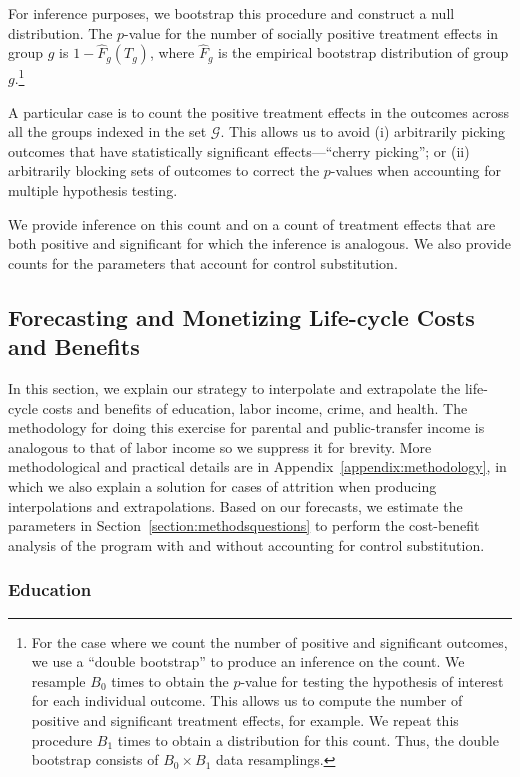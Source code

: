 For inference purposes, we bootstrap this procedure and construct a null distribution. The $p$-value for the number of socially positive treatment effects in group $g$ is $1 - \widehat{F}_{g} \left( T_{g} \right)$, where $ \widehat{F}_{g}$ is the empirical bootstrap distribution of group $g$.\footnote{For the case where we count the number of positive and significant outcomes, we use a ``double bootstrap'' to produce an inference on the count. We resample $B_{0}$ times to obtain the $p$-value for testing the hypothesis of interest for each individual outcome. This allows us to compute the number of positive and significant treatment effects, for example. We repeat this procedure $B_{1}$ times to obtain a distribution for this count. Thus, the double bootstrap consists of $B_{0} \times B_{1}$ data resamplings.}

A particular case is to count the positive treatment effects in the outcomes across all the groups indexed in the set $\mathcal{G}$. This allows us to avoid (i) arbitrarily picking outcomes that have statistically significant effects---``cherry picking''; or (ii) arbitrarily blocking sets of outcomes to correct the $p$-values when accounting for multiple hypothesis testing.

We provide inference on this count and on a count of treatment effects that are both positive and significant for which the inference is analogous. We also provide counts for the parameters that account for control substitution.

\subsection{Forecasting and Monetizing Life-cycle Costs and Benefits} \label{section:cbamethodology}

\noindent In this section, we explain our strategy to interpolate and extrapolate the life-cycle costs and benefits of education, labor income, crime, and health. The methodology for doing this exercise for parental and public-transfer income is analogous to that of labor income so we suppress it for brevity. More methodological and practical details are in Appendix~\ref{appendix:methodology}, in which we also explain a solution for cases of attrition when producing interpolations and extrapolations. Based on our forecasts, we estimate the parameters in Section~\ref{section:methodsquestions} to perform the cost-benefit analysis of the program with and without accounting for control substitution.

\subsubsection{Education}

